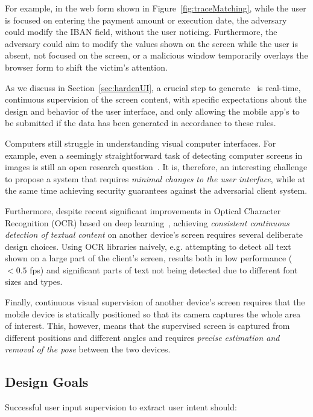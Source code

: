 For example, in the web form shown in Figure~\ref{fig:traceMatching}, while the user is focused on entering the payment amount or execution date, the adversary could modify the IBAN field, without the user noticing.
Furthermore, the adversary could aim to modify the values shown on the screen while the user is absent, not focused on the screen, or a malicious window temporarily overlays the browser form to shift the victim's attention.

As we discuss in Section~\ref{sec:hardenUI}, a crucial step to generate \PsOI\ is real-time, continuous supervision of the screen content, with  specific expectations about the design and behavior of the user interface, and only allowing the mobile app's \POI to be submitted if the data has been generated in accordance to these rules.




Computers still struggle in understanding visual computer interfaces.
For example, even a seemingly straightforward task of detecting computer screens in images is still an open research question~\cite{detectingScreens}.
It is, therefore, an interesting challenge to propose a system that requires \emph{minimal changes to the user interface}, while at the same time achieving security guarantees against the adversarial client system.

Furthermore, despite recent significant improvements in Optical Character Recognition (OCR) based on deep learning~\cite{tesseractOCR}, achieving \emph{consistent continuous detection of textual content} on another device's screen requires several deliberate design choices.
Using OCR libraries naively, e.g. attempting to detect all text shown on a large part of the client's screen, results both in low performance ($<0.5$ fps) and significant parts of text not being detected due to different font sizes and types.

Finally, continuous visual supervision of another device's screen requires that the mobile device is statically positioned so that its camera captures the whole area of interest.
This, however, means that the supervised screen is captured from different positions and different angles and requires \emph{precise estimation and removal of the pose} between the two devices.


\subsection{Design Goals}
Successful user input supervision to extract user intent should:

